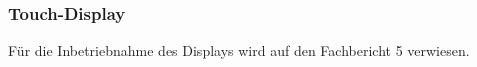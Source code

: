 \subsubsection{Touch-Display}
\label{subsubsec:Inbetriebnahme_Touch_Display}

Für die Inbetriebnahme des Displays wird auf den Fachbericht 5 verwiesen.